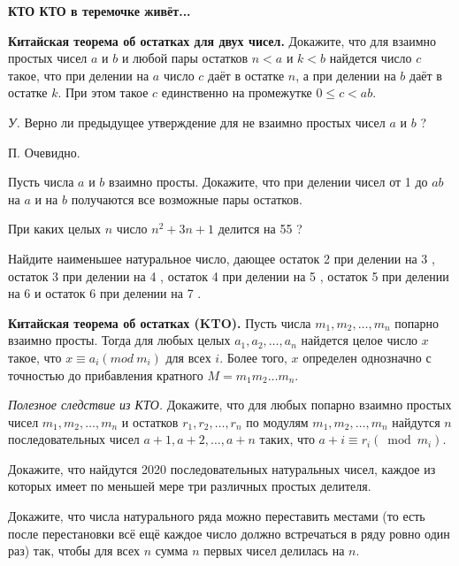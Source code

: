 \centerline{\bf \Huge КТО КТО в теремочке живёт...}
\centerline{\bf \Huge }

\begin{flushright}
        \scriptsize{}
\end{flushright}

\textbf{Китайская теорема об остатках для двух чисел.} Докажите, что для взаимно простых чисел $a$ и $b$ и любой пары остатков $n<a$ и $k<b$ найдется число $c$ такое, что при делении на $a$ число $c$ даёт в остатке $n$, а при делении на $b$ даёт в остатке $k$. При этом такое $c$ единственно на промежутке $0 \leqslant c<a b$.

\textit{У.} Верно ли предыдущее утверждение для не взаимно простых чисел $a$ и $b$ ?

П. Очевидно.

Пусть числа $a$ и $b$ взаимно просты. Докажите, что при делении чисел от 1 до $a b$ на $a$ и на $b$ получаются все возможные пары остатков.

При каких целых $n$ число $n^2+3 n+1$ делится на 55 ?

Найдите наименьшее натуральное число, дающее остаток 2 при делении на 3 , остаток 3 при делении на 4 , остаток 4 при делении на 5 , остаток 5 при делении на 6 и остаток 6 при делении на 7 .

\textbf{Китайская теорема об остатках (KTO).} Пусть числа $m_1, m_2, \ldots, m_n$ попарно взаимно просты. Тогда для любых целых $a_1, a_2, \ldots, a_n$ найдется целое число $x$ такое, что $x \equiv a_i\left(mod \ m_i\right)$ для всех $i$. Более того, $x$ определен однозначно с точностью до прибавления кратного $M=m_1 m_2 \ldots m_n$.

\textit{Полезное следствие из КТО.} Докажите, что для любых попарно взаимно простых чисел $m_1, m_2, \ldots, m_n$ и остатков $r_1, r_2, \ldots, r_n$ по модулям $m_1, m_2, \ldots, m_n$ найдутся $n$ последовательных чисел $a+1, a+2, \ldots, a+n$ таких, что $a+i \equiv r_i\left(\bmod m_i\right)$.

Докажите, что найдутся 2020 последовательных натуральных чисел, каждое из которых имеет по меньшей мере три различных простых делителя.

Докажите, что числа натурального ряда можно переставить местами (то есть после перестановки всё ещё каждое число должно встречаться в ряду ровно один раз) так, чтобы для всех $n$ сумма $n$ первых чисел делилась на $n$.